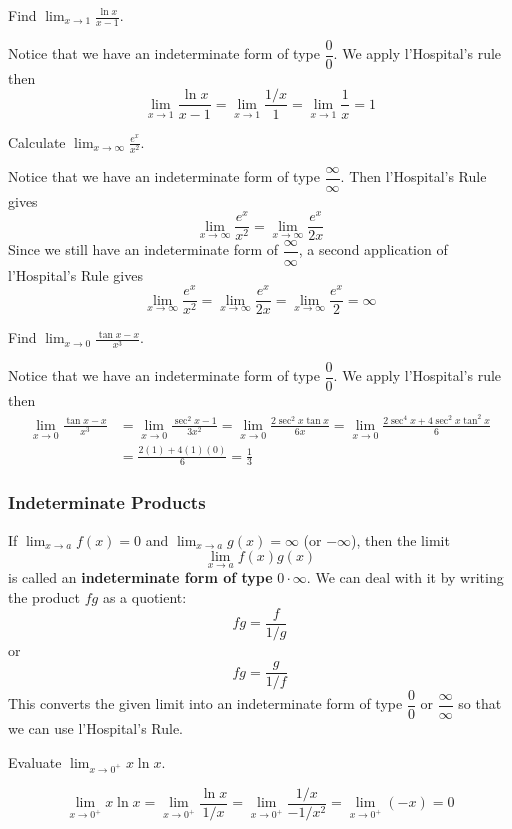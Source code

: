 \begin{problem}
    Find \(\displaystyle{\lim_{x\to 1}\frac{\ln x}{x-1}}\).
\end{problem}
\begin{solution}
    Notice that we have an indeterminate form of type \(\dfrac{0}{0}\).
    We apply l'Hospital's rule then
    \[\lim_{x\to 1}\dfrac{\ln x}{x-1}=\lim_{x\to 1}\frac{1/x}{1}
    =\lim_{x\to 1}\frac{1}{x}=1\]
\end{solution}
\begin{problem}
    Calculate \(\displaystyle{\lim_{x\to\infty}\frac{e^x}{x^2}}\).
\end{problem}
\begin{solution}
    Notice that we have an indeterminate form of type
    \(\dfrac{\infty}{\infty}\).
    Then l'Hospital's Rule gives
    \[\lim_{x\to\infty}\frac{e^x}{x^2}=\lim_{x\to\infty}\frac{e^x}{2x}\]
    Since we still have an indeterminate form of \(\dfrac{\infty}{\infty}\), a
    second application of l'Hospital's Rule gives
    \[\lim_{x\to\infty}\frac{e^x}{x^2}=\lim_{x\to\infty}\frac{e^x}{2x}
    =\lim_{x\to\infty}\frac{e^x}{2}=\infty\]
\end{solution}
\begin{problem}
    Find \(\displaystyle{\lim_{x\to 0}\frac{\tan x-x}{x^3}}\).
\end{problem}
\begin{solution}
    Notice that we have an indeterminate form of type \(\dfrac{0}{0}\).
    We apply l'Hospital's rule then
    \begin{align*}
        \lim_{x\to 0}\frac{\tan x-x}{x^3}
        &= \lim_{x\to 0}\frac{\sec^2 x-1}{3x^2}
        =\lim_{x\to 0}\frac{2\sec^2 x\tan x}{6x}
        =\lim_{x\to 0}\frac{2\sec^4 x+4\sec^2 x\tan^2 x}{6} \\
        &= \frac{2(1)+4(1)(0)}{6}=\frac{1}{3}
    \end{align*}
\end{solution}

\subsubsection*{Indeterminate Products}
If \(\displaystyle{\lim_{x\to a}f(x)=0}\) and
\(\displaystyle{\lim_{x\to a}g(x)=\infty}\) (or \(-\infty\)),
then the limit
\[\lim_{x\to a}f(x)g(x)\]
is called an \textbf{indeterminate form of type} \(0\cdot\infty\).
We can deal with it by writing the product \(fg\) as a quotient:
\[fg=\frac{f}{1/g}\]
or
\[fg=\frac{g}{1/f}\]
This converts the given limit into an indeterminate form of type
\(\dfrac{0}{0}\) or \(\dfrac{\infty}{\infty}\) so that we can use l'Hospital's
Rule.
\begin{problem}
    Evaluate \(\displaystyle{\lim_{x\to 0^+}x\ln x}\).
\end{problem}
\begin{solution}

    \[\lim_{x\to 0^+}x\ln x=\lim_{x\to 0^+}\frac{\ln x}{1/x}
    =\lim_{x\to 0^+}\frac{1/x}{-1/x^2}=\lim_{x\to 0^+}(-x)=0\]
\end{solution}

